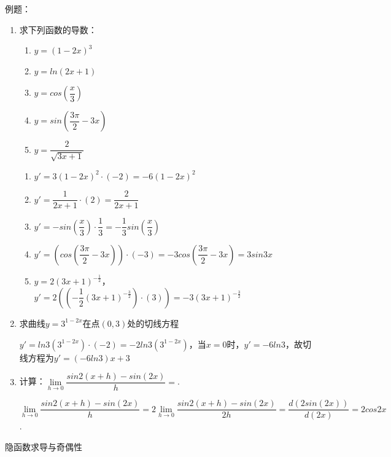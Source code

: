 例题：
\begin{enumerate}
    \item 求下列函数的导数：
    \begin{enumerate}
        \item $y = (1-2x)^3$
        \item $y = ln(2x+1)$
        \item $y = cos\left(\dfrac{x}{3}\right)$
        \item $y = sin\left(\dfrac{3\pi}{2} - 3x\right)$
        \item $y = \dfrac{2}{\sqrt{3x+1}}$
    \end{enumerate}
    \begin{jieda}
        \begin{enumerate}
            \item $y' = 3(1-2x)^2 \cdot (-2) = -6(1-2x)^2$
            \item $y' = \dfrac{1}{2x+1} \cdot (2) = \dfrac{2}{2x+1}$
            \item $y' = -sin\left(\dfrac{x}{3}\right) \cdot \dfrac{1}{3} = -\dfrac{1}{3}sin\left(\dfrac{x}{3}\right)$
            \item $y' = \left(cos\left(\dfrac{3\pi}{2}-3x\right)\right) \cdot (-3) = -3cos\left(\dfrac{3\pi}{2}-3x\right) = 3sin3x$
            \item $y = 2(3x+1)^{-\frac{1}{2}}$，$y' = 2\left(\left(-\dfrac{1}{2}(3x+1)^{-\frac{3}{2}}\right) \cdot (3)\right) = -3(3x+1)^{-\frac{3}{2}}$
        \end{enumerate}
    \end{jieda}
    \item 求曲线$y = 3^{1-2x}$在点$(0, 3)$处的切线方程
    \begin{jieda}
        $y' = ln3(3^{1-2x}) \cdot(-2) = -2ln3(3^{1-2x})$，当$x = 0$时，$y' = -6ln3$，故切线方程为$y' = (-6ln3)x+3$
    \end{jieda}

    \item 计算：$\lim\limits_{h \to 0}\dfrac{sin2(x+h)-sin(2x)}{h} = $.
    \begin{jieda}
        $\lim\limits_{h \to 0}\dfrac{sin2(x+h)-sin(2x)}{h} = 2\lim\limits_{h \to 0}\dfrac{sin2(x+h)-sin(2x)}{2h} = \dfrac{d(2sin(2x))}{d(2x)} = 2cos2x$.
    \end{jieda}
\end{enumerate}

隐函数求导与奇偶性

